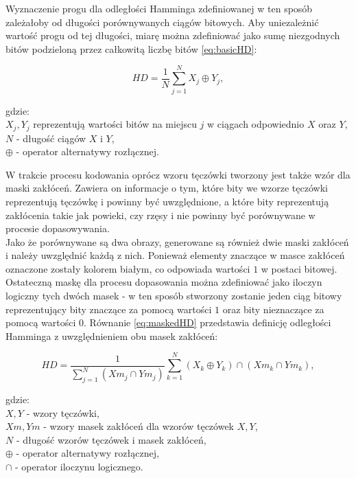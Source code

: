 Wyznaczenie progu dla odległości Hamminga zdefiniowanej w ten sposób zależałoby od długości
porównywanych ciągów bitowych. Aby uniezależni\'c wartoś\'c progu od tej długości, miarę można
zdefiniowa\'c jako sumę niezgodnych bitów podzieloną przez całkowitą liczbę bitów \ref{eq:basicHD}:

\begin{equation}
  \mathit{HD} = \frac{1}{N}\sum\limits_{j=1}^{N}X_{j} \oplus Y_{j},
  \label{eq:basicHD}
\end{equation}

\noindent
gdzie:\\
\indent $X_{j}, Y_{j}$ reprezentują wartości bitów na miejscu $j$ w ciągach odpowiednio $X$ oraz $Y$,\\
\indent $N$ - długoś\'c ciągów $X$ i $Y$,\\
\indent $\oplus$ - operator alternatywy rozłącznej.\newline

W trakcie procesu kodowania oprócz wzoru tęczówki tworzony jest także wzór dla maski zakłóceń.
Zawiera on informacje o tym, które bity we wzorze tęczówki reprezentują tęczówkę i powinny by\'c
uwzględnione, a które bity reprezentują zakłócenia takie jak powieki, czy rzęsy i nie powinny by\'c
porównywane w procesie dopasowywania.\\
Jako że porównywane są dwa obrazy, generowane są również dwie maski zakłóceń i należy uwzględni\'c
każdą z nich. Ponieważ elementy znaczące w masce zakłóceń oznaczone zostały kolorem białym, co odpowiada
wartości $1$ w postaci bitowej. Ostateczną maskę dla procesu dopasowania można zdefiniowa\'c jako
iloczyn logiczny tych dwóch masek - w ten sposób stworzony zostanie jeden ciąg bitowy reprezentujący
bity znaczące za pomocą wartości $1$ oraz bity nieznaczące za pomocą wartości $0$.
Równanie \ref{eq:maskedHD} przedstawia definicję odległości Hamminga z uwzględnieniem obu masek zakłóceń:

\begin{equation}
  \mathit{HD} = \frac{1}{\sum\limits_{j=1}^{N} \left( \mathit{Xm}_{j} \cap \mathit{Ym}_{j} \right) }
       \sum\limits_{k=1}^{N} \left(X_{k} \oplus Y_{k} \right) \cap \left( \mathit{Xm}_{k} \cap \mathit{Ym}_{k} \right),
  \label{eq:maskedHD}
\end{equation}

\noindent
gdzie:\\
\indent $X, Y$ - wzory tęczówki,\\
\indent $\mathit{Xm}, \mathit{Ym}$ - wzory masek zakłóceń dla wzorów tęczówek $X, Y$,\\
\indent $N$ - długoś\'c wzorów tęczówek i masek zakłóceń,\\
\indent $\oplus$ - operator alternatywy rozłącznej,\\
\indent $\cap$ - operator iloczynu logicznego.\newline

